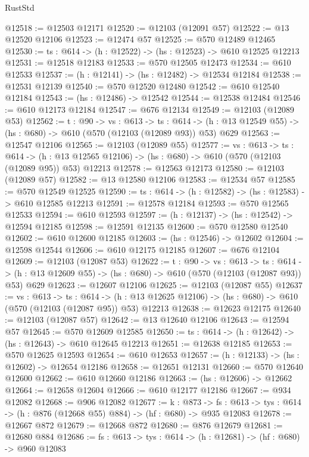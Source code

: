 \begin{lexlean}{RustStd}
\begin{coremodule}
@12518 := @12503 @12171
@12520 := @12103 (@12091 @57)
@12522 := @13 @12520 @12106
@12523 := @12474 @57
@12525 := @570 @12489 @12465
@12530 := {ts : @614} -> (h : @12522) -> (hs : @12523) -> @610 @12525 @12213
@12531 := @12518 @12183
@12533 := @570 @12505 @12473
@12534 := @610 @12533
@12537 := (h : @12141) -> (hs : @12482) -> @12534 @12184
@12538 := @12531 @12139
@12540 := @570 @12520 @12480
@12542 := @610 @12540 @12184
@12543 := (hs : @12486) -> @12542
@12544 := @12538 @12484
@12546 := @610 @12173 @12184
@12547 := @676 @12134
@12549 := @12103 (@12089 @53)
@12562 := {t : @90} ->
  {vs : @613} ->
  {ts : @614} -> (h : @13 @12549 @55) -> (hs : @680) -> @610 (@570 (@12103 (@12089 @93)) @53) @629
@12563 := @12547 @12106
@12565 := @12103 (@12089 @55)
@12577 := {vs : @613} ->
  {ts : @614} ->
  (h : @13 @12565 @12106) -> (hs : @680) -> @610 (@570 (@12103 (@12089 @95)) @53) @12213
@12578 := @12563 @12173
@12580 := @12103 (@12089 @57)
@12582 := @13 @12580 @12106
@12583 := @12534 @57
@12585 := @570 @12549 @12525
@12590 := {ts : @614} -> (h : @12582) -> (hs : @12583) -> @610 @12585 @12213
@12591 := @12578 @12184
@12593 := @570 @12565 @12533
@12594 := @610 @12593
@12597 := (h : @12137) -> (hs : @12542) -> @12594 @12185
@12598 := @12591 @12135
@12600 := @570 @12580 @12540
@12602 := @610 @12600 @12185
@12603 := (hs : @12546) -> @12602
@12604 := @12598 @12544
@12606 := @610 @12175 @12185
@12607 := @676 @12104
@12609 := @12103 (@12087 @53)
@12622 := {t : @90} ->
  {vs : @613} ->
  {ts : @614} -> (h : @13 @12609 @55) -> (hs : @680) -> @610 (@570 (@12103 (@12087 @93)) @53) @629
@12623 := @12607 @12106
@12625 := @12103 (@12087 @55)
@12637 := {vs : @613} ->
  {ts : @614} ->
  (h : @13 @12625 @12106) -> (hs : @680) -> @610 (@570 (@12103 (@12087 @95)) @53) @12213
@12638 := @12623 @12175
@12640 := @12103 (@12087 @57)
@12642 := @13 @12640 @12106
@12643 := @12594 @57
@12645 := @570 @12609 @12585
@12650 := {ts : @614} -> (h : @12642) -> (hs : @12643) -> @610 @12645 @12213
@12651 := @12638 @12185
@12653 := @570 @12625 @12593
@12654 := @610 @12653
@12657 := (h : @12133) -> (hs : @12602) -> @12654 @12186
@12658 := @12651 @12131
@12660 := @570 @12640 @12600
@12662 := @610 @12660 @12186
@12663 := (hs : @12606) -> @12662
@12664 := @12658 @12604
@12666 := @610 @12177 @12186
@12667 := @934 @12082
@12668 := @906 @12082
@12677 := {k : @873} ->
  {fs : @613} -> {tys : @614} -> (h : @876 (@12668 @55) @884) -> (hf : @680) -> @935 @12083
@12678 := @12667 @872
@12679 := @12668 @872
@12680 := @876 @12679
@12681 := @12680 @884
@12686 := {fs : @613} -> {tys : @614} -> (h : @12681) -> (hf : @680) -> @960 @12083

\end{coremodule}
\end{lexlean}
